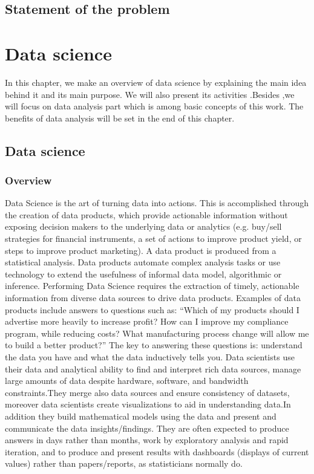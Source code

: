 \documentclass[a4paper,12pt,oneside]{report}
\begin{document}
\section{Statement of the problem}
{

\chapter{Data science}
{In this chapter, we make an overview of data science by explaining the main idea behind it and its main purpose. We will also  present its activities .Besides ,we will focus  on data analysis part  which is among basic concepts of this work. The benefits of data analysis will be set in the end of this chapter.}
\section{Data science}
\subsection{Overview}
{  Data Science is the art of turning data into actions. This is accomplished through the creation of data products, which provide actionable information without exposing decision makers to the underlying data or analytics (e.g. buy/sell strategies for financial instruments, a set of actions to improve product yield, or steps to improve product marketing). A data product is produced from a statistical analysis. Data products automate complex analysis tasks or use technology to extend the usefulness of informal data model, algorithmic or inference.
Performing Data Science requires the extraction of timely, actionable information from diverse data sources to drive data products.
Examples of data products include answers to questions such as:
“Which of my products should I advertise more heavily to increase profit? How can I improve my compliance program, while reducing costs? What manufacturing process change will allow me to build a better product?” The key to answering these questions is: understand the data you have and what the data inductively tells you.
Data scientists use their data and analytical ability to find and interpret rich data sources, manage large amounts of data despite hardware, software, and bandwidth constraints.They merge also data sources and ensure consistency of datasets, moreover data scientists  create visualizations to aid in understanding data.In addition they build mathematical models using the data and present and communicate the data insights/findings. They are often expected to produce answers in days rather than months, work by exploratory analysis and rapid iteration, and to produce and present results with dashboards (displays of current values) rather than papers/reports, as statisticians normally do.}
}
\end{document}
